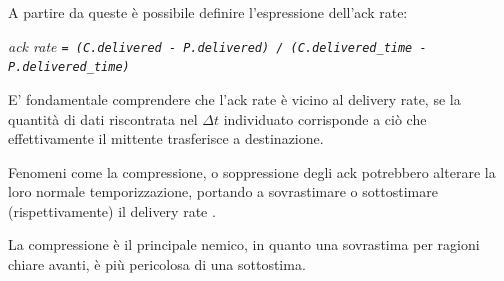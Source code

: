 A partire da queste è possibile definire l'espressione dell'ack rate:

\begin{center}

\textit{ack rate \texttt{= (C.delivered - P.delivered) / (C.delivered\_time - P.delivered\_time)}}

\end{center}

E' fondamentale comprendere che l'ack rate è vicino al delivery rate, se la quantità di dati riscontrata nel $ \Delta t$ individuato corrisponde a ciò che effettivamente il mittente trasferisce a destinazione.\bigskip

Fenomeni come la compressione, o soppressione degli ack potrebbero alterare la loro normale temporizzazione, portando a sovrastimare o sottostimare (rispettivamente) il delivery rate \cite{ietf:ack-suppression}. \bigskip

La compressione è il principale nemico, in quanto una sovrastima per ragioni chiare avanti, è più pericolosa di una sottostima. \bigskip

